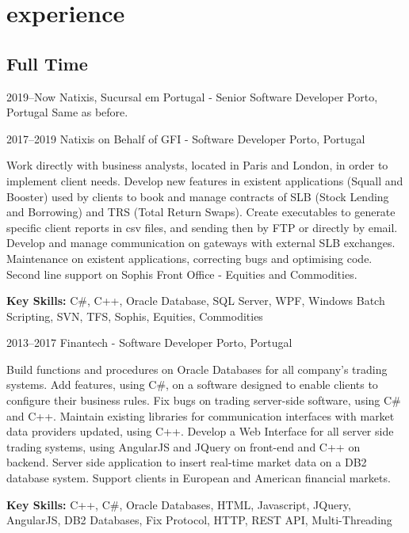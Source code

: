 \documentclass[]{friggeri-cv} %
\begin{document}

\section{experience}

\subsection{Full Time}

\begin{entrylist}


\entry
{2019--Now}
{Natixis, Sucursal em Portugal - Senior Software Developer}
{Porto, Portugal}
{
Same as before.
}


\entry
{2017--2019}
{Natixis on Behalf of GFI - Software Developer}
{Porto, Portugal}
{
Work directly with business analysts, located in Paris and London, in order to implement client needs. Develop new features in existent applications (Squall and Booster) used by clients to book and manage contracts of SLB (Stock Lending and Borrowing) and TRS (Total Return Swaps).  Create executables to generate specific client reports in csv files, and sending then by FTP or directly by email. Develop and manage communication on gateways with external SLB exchanges. Maintenance on existent applications, correcting bugs and optimising code. Second line support on Sophis Front Office - Equities and Commodities.

\textbf{Key Skills:}
C\#, C++, Oracle Database, SQL Server, WPF, Windows Batch Scripting, SVN, TFS, Sophis, Equities, Commodities
}


\entry
{2013--2017}
{Finantech - Software Developer}
{Porto, Portugal}
{
Build functions and procedures on Oracle Databases for all company's trading systems. Add features, using C\#, on a software designed to enable clients to configure their business rules. Fix bugs on trading server-side software, using C\# and C++. Maintain existing libraries for communication interfaces with market data providers updated, using C++. Develop a Web Interface for all server side trading systems, using AngularJS and JQuery on front-end and C++ on backend. Server side application to insert real-time market data on a DB2 database system. Support clients in European and American financial markets. 

\textbf{Key Skills: }
C++, C\#, Oracle Databases, HTML, Javascript, JQuery, AngularJS, DB2 Databases, Fix Protocol, HTTP, REST API, Multi-Threading
}


\end{entrylist}
\end{document}
